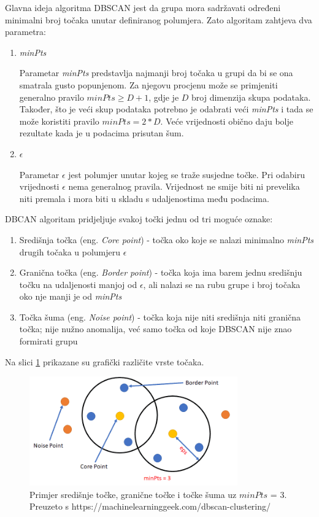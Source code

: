 \documentclass[utf8, diplomski, numeric]{fer}
\begin{document}
Glavna ideja algoritma DBSCAN jest da grupa mora sadržavati određeni minimalni broj točaka unutar definiranog polumjera. Zato algoritam zahtjeva dva parametra: 
\begin{enumerate}
\item \textit{minPts} 

Parametar \textit{minPts} predstavlja najmanji broj točaka u grupi da bi se ona smatrala gusto popunjenom. Za njegovu procjenu može se primjeniti generalno pravilo $minPts \geq D + 1$, gdje je $D$ broj dimenzija skupa podataka. Također, što je veći skup podataka potrebno je odabrati veći \textit{minPts} i tada se može koristiti pravilo $minPts = 2*D$. Veće vrijednosti obično daju bolje rezultate kada je u podacima prisutan šum.
\item $\epsilon$

Parametar $\epsilon$ jest polumjer unutar kojeg se traže susjedne točke. Pri odabiru vrijednosti $\epsilon$ nema generalnog pravila. Vrijednost ne smije biti ni prevelika niti premala i mora biti u skladu s udaljenostima među podacima. 
\end{enumerate}

DBCAN algoritam pridjeljuje svakoj točki jednu od tri moguće oznake:
\begin{enumerate}
\item Središnja točka (eng. \textit{Core point}) - točka oko koje se nalazi minimalno \textit{minPts} drugih točaka u polumjeru $\epsilon$
\item Granična točka (eng. \textit{Border point}) - točka koja ima barem jednu središnju točku na udaljenosti manjoj od $\epsilon$, ali nalazi se na rubu grupe i broj točaka oko nje manji je od \textit{minPts} 
\item Točka šuma (eng. \textit{Noise point}) - točka koja nije niti središnja niti granična točka; nije nužno anomalija, već samo točka od koje DBSCAN nije znao formirati grupu
\end{enumerate}

Na slici \ref{fig:dbscan-points} prikazane su grafički različite vrste točaka.

\begin{figure}[htb]
\includegraphics[width=0.8\textwidth]{images/dbscan-points.png}
\centering
\caption{Primjer središnje točke, granične točke i točke šuma uz $minPts$ = 3. Preuzeto s  https://machinelearninggeek.com/dbscan-clustering/}
\label{fig:dbscan-points}
\end{figure}
\end{document}

